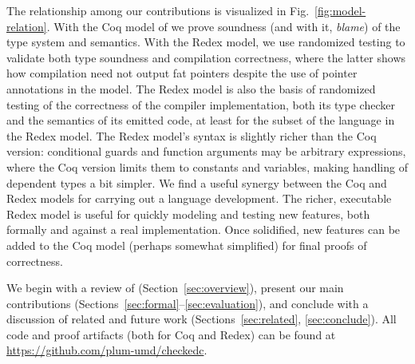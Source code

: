  The
  relationship among our contributions is visualized in
  Fig.~\ref{fig:model-relation}. With the Coq model of \lang we prove
  soundness (and with it, \emph{blame}) of the \checkedc type system
  and semantics. With the Redex model, we use randomized testing to
  validate both type soundness and compilation correctness, where the
  latter shows how compilation need not output fat pointers despite
  the use of pointer annotations in the \lang model. The Redex \lang
  model is also the basis of randomized testing of the correctness of
  the \checkedc compiler implementation, both its type checker and the
  semantics of its emitted code, at least for the subset of the
  language in the Redex model. The Redex model's syntax
  is slightly richer than the Coq version: conditional guards and
  function arguments may be arbitrary expressions, where the Coq
  version limits them to constants and variables, making handling of
  dependent types a bit simpler. We find a useful synergy between the
  Coq and Redex models for carrying out a language development. The
  richer, executable Redex model is useful for quickly modeling and
  testing new features, both formally and against a real
  implementation. Once solidified, new features can be added to the
  Coq model (perhaps somewhat simplified) for final proofs of
  correctness.

We begin with a review of \checkedc (Section~\ref{sec:overview}),
present our main contributions
(Sections~\ref{sec:formal}--\ref{sec:evaluation}), and conclude with a
discussion of 
related and future work (Sections~\ref{sec:related},
\ref{sec:conclude}). All code and proof artifacts (both for Coq and
Redex) can be found at \url{https://github.com/plum-umd/checkedc}. 










